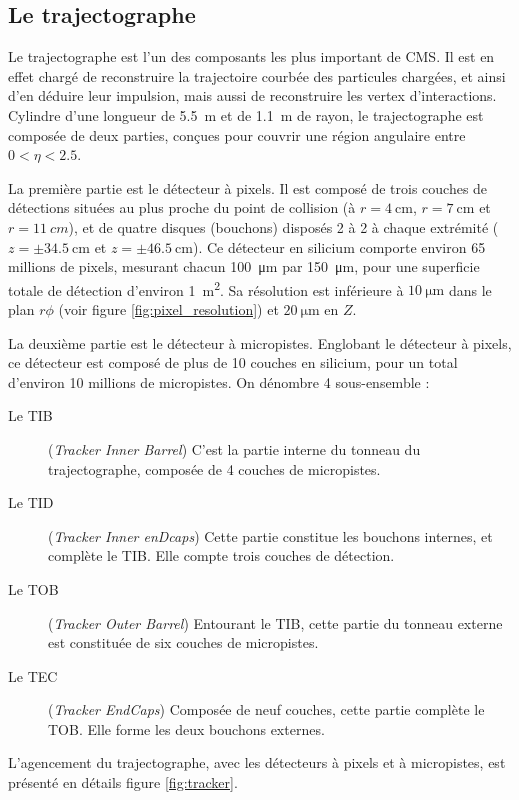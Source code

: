 \subsection{Le trajectographe}

Le trajectographe est l'un des composants les plus important de CMS. Il est en effet chargé de reconstruire la trajectoire courbée des particules chargées, et ainsi d'en déduire leur impulsion, mais aussi de reconstruire les vertex d'interactions. Cylindre d'une longueur de \SI{5.5}{\m} et de \SI{1.1}{\m} de rayon, le trajectographe est composée de deux parties, conçues pour couvrir une région angulaire entre $0 < \eta < \num{2.5}$.

\smallskip

La première partie est le détecteur à pixels. Il est composé de trois couches de détections situées au plus proche du point de collision (à $r = \SI{4}{\cm}$, $r = \SI{7}{\cm}$ et $r = \SI{11}{cm}$), et de quatre disques (bouchons) disposés 2 à 2 à chaque extrémité ($z = \pm \SI{34.5}{\cm}$ et $z = \pm \SI{46.5}{\cm}$). Ce détecteur en silicium comporte environ 65 millions de pixels, mesurant chacun \SI{100}{\um} par \SI{150}{\um}, pour une superficie totale de détection d'environ \SI{1}{\square\m}. Sa résolution est inférieure à $\SI{10}{\um}$ dans le plan $r\phi$ (voir figure \ref{fig:pixel_resolution}) et $\SI{20}{\um}$ en $Z$.

La deuxième partie est le détecteur à micropistes. Englobant le détecteur à pixels, ce détecteur est composé de plus de 10 couches en silicium, pour un total d'environ 10 millions de micropistes. On dénombre 4 sous-ensemble :

\begin{description}
  \item[Le TIB] (\emph{Tracker Inner Barrel}) C'est la partie interne du tonneau du trajectographe, composée de 4 couches de micropistes.
  \item[Le TID] (\emph{Tracker Inner enDcaps}) Cette partie constitue les bouchons internes, et complète le TIB. Elle compte trois couches de détection.
  \item[Le TOB] (\emph{Tracker Outer Barrel}) Entourant le TIB, cette partie du tonneau externe est constituée de six couches de micropistes.
  \item[Le TEC] (\emph{Tracker EndCaps}) Composée de neuf couches, cette partie complète le TOB. Elle forme les deux bouchons externes.
\end{description}

L'agencement du trajectographe, avec les détecteurs à pixels et à micropistes, est présenté en détails figure \ref{fig:tracker}.

